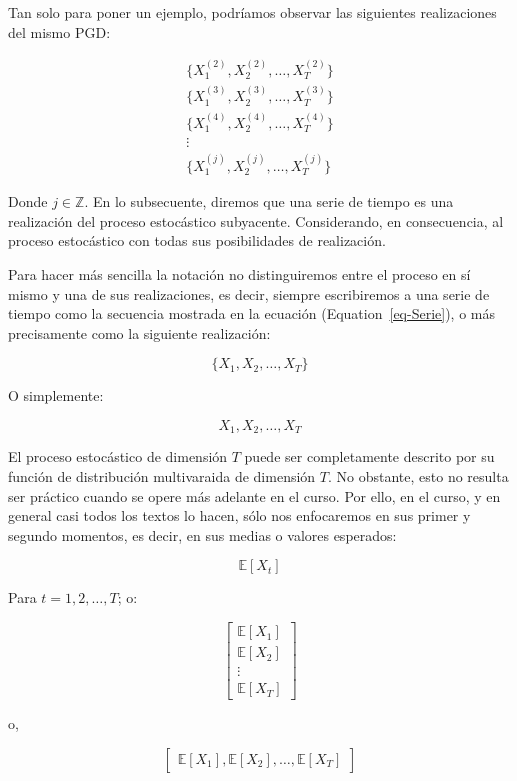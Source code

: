 \documentclass[
  a4paper,
]{article}
\begin{document}
Tan solo para poner un ejemplo, podríamos observar las siguientes
realizaciones del mismo PGD:

\begin{eqnarray*}
  & \{X^{(2)}_1, X^{(2)}_2, \ldots, X^{(2)}_T\} & \\
  & \{X^{(3)}_1, X^{(3)}_2, \ldots, X^{(3)}_T\} & \\
  & \{X^{(4)}_1, X^{(4)}_2, \ldots, X^{(4)}_T\} & \\
  & \vdots & \\
  & \{X^{(j)}_1, X^{(j)}_2, \ldots, X^{(j)}_T\} &
\end{eqnarray*}

Donde \(j \in \mathbb{Z}\). En lo subsecuente, diremos que una serie de
tiempo es una realización del proceso estocástico subyacente.
Considerando, en consecuencia, al proceso estocástico con todas sus
posibilidades de realización.

Para hacer más sencilla la notación no distinguiremos entre el proceso
en sí mismo y una de sus realizaciones, es decir, siempre escribiremos a
una serie de tiempo como la secuencia mostrada en la ecuación
(Equation~\ref{eq-Serie}), o más precisamente como la siguiente
realización:

\[
\{ X_1, X_2, \ldots, X_T \}
\]

O simplemente:

\[
X_1, X_2, \ldots, X_T
\]

El proceso estocástico de dimensión \(T\) puede ser completamente
descrito por su función de distribución multivaraida de dimensión \(T\).
No obstante, esto no resulta ser práctico cuando se opere más adelante
en el curso. Por ello, en el curso, y en general casi todos los textos
lo hacen, sólo nos enfocaremos en sus primer y segundo momentos, es
decir, en sus medias o valores esperados:

\[
\mathbb{E}[X_t]
\]

Para \(t = 1, 2, \ldots, T\); o:

\[
\left[
    \begin{array}{c}
    \mathbb{E}[X_1] \\
    \mathbb{E}[X_2] \\
    \vdots \\
    \mathbb{E}[X_T]
    \end{array}
\right]
\]

o,

\[
\left[
    \begin{array}{c}
    \mathbb{E}[X_1], \mathbb{E}[X_2], \ldots, \mathbb{E}[X_T]
    \end{array}
\right]
\]
\end{document}
